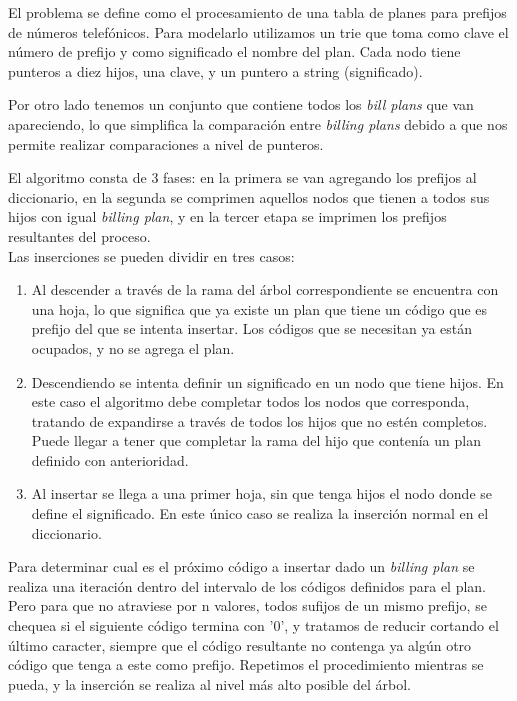 El problema se define como el procesamiento de una tabla de planes para
prefijos de números telefónicos. Para modelarlo utilizamos un trie que
toma como clave el número de prefijo y como significado el nombre del
plan. Cada nodo tiene punteros a diez hijos, una clave, y un puntero a string
(significado).

Por otro lado tenemos un conjunto que contiene todos los {\sl bill plans}
que van apareciendo, lo que simplifica la comparación entre {\sl billing
plans} debido a que nos permite realizar comparaciones a nivel de punteros.

El algoritmo consta de 3 fases: en la primera se van agregando los prefijos
al diccionario, en la segunda se comprimen aquellos nodos que tienen a todos sus
hijos con igual {\sl billing plan}, y en la tercer etapa se imprimen los prefijos
resultantes del proceso.\\

Las inserciones se pueden dividir en tres casos:

\begin{enumerate}
  \item Al descender a través de la rama del árbol correspondiente se
  encuentra con una hoja, lo que significa que ya existe un plan que tiene
  un código que es prefijo del que se intenta insertar. Los códigos que se
  necesitan ya están ocupados, y no se agrega el plan.

  \item Descendiendo se intenta definir un significado en un nodo que
  tiene hijos. En este caso el algoritmo debe completar todos los nodos que
  corresponda, tratando de expandirse a través de todos los hijos que no
  estén completos. Puede llegar a tener que completar la rama del hijo que
  contenía un plan definido con anterioridad.

  \item Al insertar se llega a una primer hoja, sin que tenga hijos el nodo
  donde se define el significado. En este único caso se realiza la inserción
  normal en el diccionario.
\end{enumerate}

Para determinar cual es el próximo código a insertar dado un {\sl billing
plan} se realiza una iteración dentro del intervalo de los códigos definidos
para el plan. Pero para que no atraviese por n valores, todos sufijos de un
mismo prefijo, se chequea si el siguiente código termina con '0', y tratamos
de reducir cortando el último caracter, siempre que el código resultante
no contenga ya algún otro código que tenga a este como prefijo. Repetimos
el procedimiento mientras se pueda, y la inserción se realiza al nivel más
alto posible del árbol.

